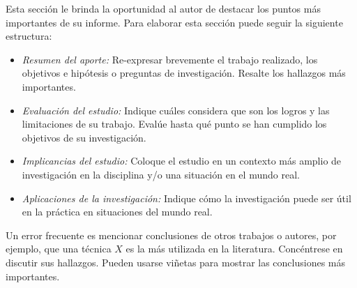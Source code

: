 \documentclass[../main.tex]{subfiles}
\begin{document}

Esta sección le brinda la oportunidad al autor de destacar los puntos más importantes de su informe. Para elaborar esta sección puede seguir la siguiente estructura:

\begin{itemize}
  \item \textit{Resumen del aporte:} Re-expresar brevemente el trabajo realizado, los objetivos e hipótesis o preguntas de investigación. Resalte los hallazgos más importantes.
  \item \textit{Evaluación del estudio:} Indique cuáles considera que son los logros y las limitaciones de su trabajo. Evalúe hasta qué punto se han cumplido los objetivos de su investigación.
  \item \textit{Implicancias del estudio:} Coloque el estudio en un contexto más amplio de investigación en la disciplina y/o una situación en el mundo real.
  \item \textit{Aplicaciones de la investigación:} Indique cómo la investigación puede ser útil en la práctica en situaciones del mundo real.
\end{itemize}

Un error frecuente es mencionar conclusiones de otros trabajos o autores, por ejemplo, que una técnica $X$ es la más utilizada en la literatura. Concéntrese en discutir sus hallazgos. Pueden usarse viñetas para mostrar las conclusiones más importantes.
\end{document}
